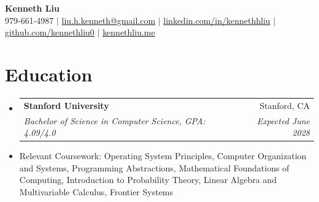 \documentclass[letterpaper,11pt]{article}
\makeatletter
\newcommand{\resumeSubheading}[4]{
  \vspace{-2pt}\item
    \begin{tabular*}{0.97\textwidth}[t]{l@{\extracolsep{\fill}}r}
      \textbf{#1} & #2 \\
      \textit{\small#3} & \textit{\small #4} \\
    \end{tabular*}\vspace{-7pt}
}
\newcommand{\resumeSubText}[1]{
    \vspace{-5pt}\item
  {\small #1}\vspace{-2pt}
}
\newcommand{\resumeSubHeadingListStart}{\begin{itemize}[leftmargin=0.15in, label={}]}
\newcommand{\resumeSubHeadingListEnd}{\end{itemize}}
\makeatother
\begin{document}

\begin{center}
    \textbf{\Huge  Kenneth Liu} \\ \vspace{1pt}
    \small 979-661-4987 $|$ 
    {
    \href{mailto:liu.h.kenneth@gmail.com}{liu.h.kenneth@gmail.com} $|$ 
    \href{https://linkedin.com/in/kennethhliu}{linkedin.com/in/kennethhliu} $|$ 
    \href{https://github.com/kennethliu0}{github.com/kennethliu0} $|$ 
    \href{https://kennethliu.me}{kennethliu.me}}
\end{center}


\section{Education}
  \resumeSubHeadingListStart
    \resumeSubheading
      {Stanford University}{Stanford, CA}
      {Bachelor of Science in Computer Science, GPA: 4.09/4.0
      }
      {Expected June 2028}
      \resumeSubText{Relevant Coursework: Operating System Principles, Computer Organization and Systems, Programming Abstractions, Mathematical Foundations of Computing, Introduction to Probability Theory, Linear Algebra and Multivariable Calculus, Frontier Systems}
    
      
  \resumeSubHeadingListEnd


\end{document}
